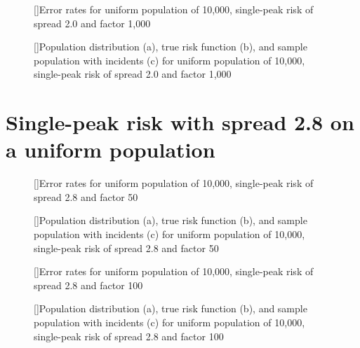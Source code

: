 {\begin{figure}[!htb]
    
    []{Error rates for uniform population of 10,000, single-peak risk of \gls{spread} 2.0 and \gls{factor} 1,000}
    \label{tab:mean_error_rates:unif_1000_2.0_1h}
    
    []{Population distribution (a), true risk function (b), and sample population with incidents (c) for uniform population of 10,000, single-peak risk of \gls{spread} 2.0 and \gls{factor} 1,000}
    \label{fig:distributions:unif_1000_2.0_1h}    
\end{figure}


 
\section{Single-peak risk with spread 2.8 on a uniform population}
\label{sec:app:results_unif_2.8_1h}


\begin{figure}[!htb]
    
    []{Error rates for uniform population of 10,000, single-peak risk of \gls{spread} 2.8 and \gls{factor} 50}
    \label{tab:mean_error_rates:unif_50_2.8_1h}
    
    []{Population distribution (a), true risk function (b), and sample population with incidents (c) for uniform population of 10,000, single-peak risk of \gls{spread} 2.8 and \gls{factor} 50}
    \label{fig:distributions:unif_50_2.8_1h}    
\end{figure}



\begin{figure}[!htb]
    
    []{Error rates for uniform population of 10,000, single-peak risk of \gls{spread} 2.8 and \gls{factor} 100}
    \label{tab:mean_error_rates:unif_100_2.8_1h}
    
    []{Population distribution (a), true risk function (b), and sample population with incidents (c) for uniform population of 10,000, single-peak risk of \gls{spread} 2.8 and \gls{factor} 100}
    \label{fig:distributions:unif_100_2.8_1h}    
\end{figure}


}
